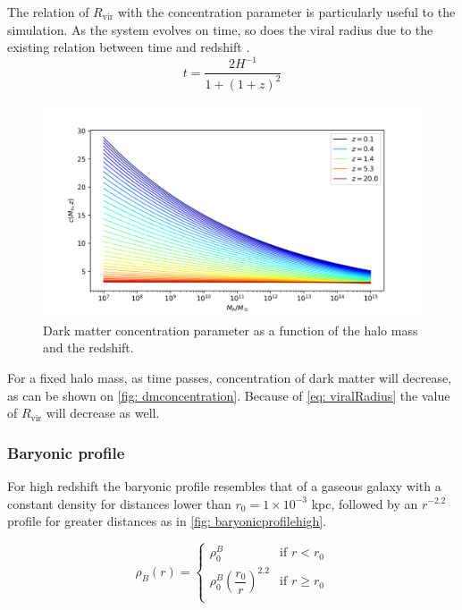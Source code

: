 		The relation of $R_\text{vir}$ with the concentration parameter is particularly useful to the simulation. As the system evolves on time, so does the viral radius due to the existing relation between time and redshift \cite{carmeli2006cosmic}.
		\begin{equation}\label{eq: t_redshift}
			t = \dfrac{2H^{-1}}{1 + (1 + z) ^ 2}
		\end{equation}	
	
		\begin{figure}[h]
			\centering
			\includegraphics[width=0.7\linewidth]{"../Files/Week 3/darkmatter_concentration"}
			\caption{Dark matter concentration parameter as a function of the halo mass and the redshift.}
			\label{fig: dmconcentration}
		\end{figure}
	
		For a fixed halo mass, as time passes, concentration of dark matter will decrease, as can be shown on \autoref{fig: dmconcentration}. Because of \autoref{eq: viralRadius} the value of $R_\text{vir}$ will decrease as well.
	
		\subsubsection{Baryonic profile}
			For high redshift the baryonic profile resembles that of a gaseous galaxy with a constant density for distances lower than $r_0 = 1\times10^{-3}$ kpc, followed by an $r^{-2.2}$ profile for greater distances as in \autoref{fig: baryonicprofilehigh}.
			
			\begin{equation}
				\rho_B(r) = \left \{
				\begin{matrix}
				\rho_0^B & \text{if $r < r_0$}\\
				\rho_0^B\left(\dfrac{r_0}{r}\right)^{2.2} & \text{if $r \geq r_0$}\\
				\end{matrix}
				\right.
			\end{equation}
			
